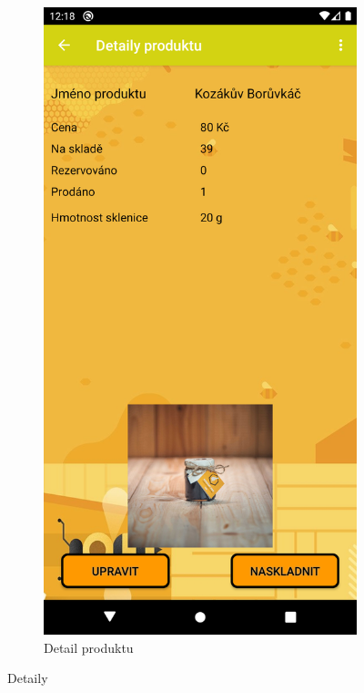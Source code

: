 \documentclass[12pt]{report}
\begin{document}
\begin{figure}[H]
\begin{subfigure}{.45\textwidth}
	  \centering
	  \includegraphics[width=\textwidth]{img/product_detail.png}
	  \caption{Detail produktu}
	  \label{fig:product_det}
	\end{subfigure}
	\caption{Detaily}
	\label{fig:detail_cont}
\end{figure}
\end{document}
